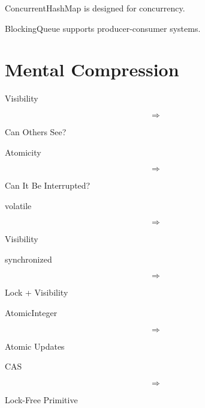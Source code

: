 \documentclass[11pt,a4paper]{book}
\begin{document}
\begin{rosettarule}

ConcurrentHashMap is designed for concurrency.

\end{rosettarule}


\begin{rosettarule}

BlockingQueue supports producer-consumer systems.

\end{rosettarule}


\section{Mental Compression}

Visibility

\[
\Rightarrow
\]

Can Others See?


Atomicity

\[
\Rightarrow
\]

Can It Be Interrupted?


volatile

\[
\Rightarrow
\]

Visibility


synchronized

\[
\Rightarrow
\]

Lock + Visibility


AtomicInteger

\[
\Rightarrow
\]

Atomic Updates


CAS

\[
\Rightarrow
\]

Lock-Free Primitive

\end{document}

